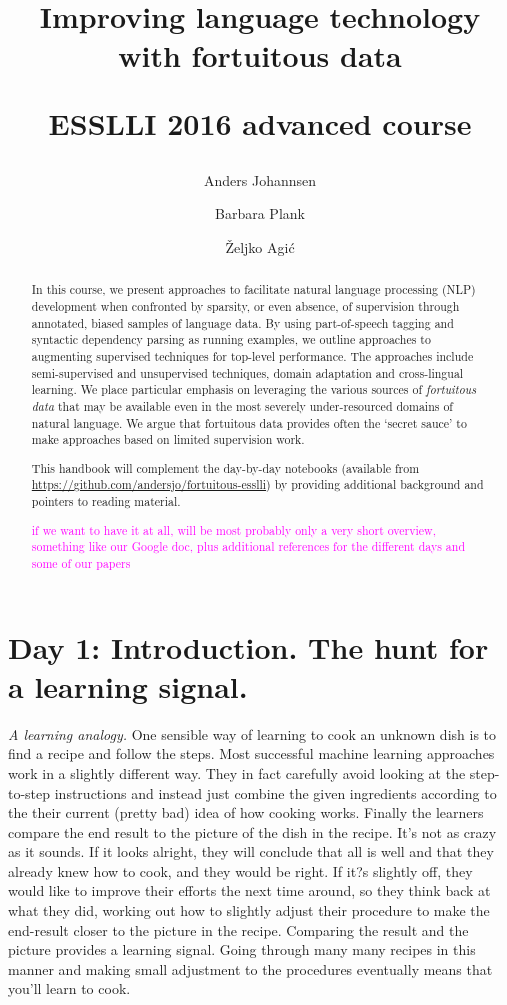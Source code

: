 \documentclass{article}
\title{Improving language technology \\with fortuitous data \\\begin{small}ESSLLI 2016 advanced course\end{small}}
\author{Anders Johannsen \and Barbara Plank\and Željko Agić}
\date{}
\begin{document}
\maketitle



\begin{abstract}
In this course, we present approaches to facilitate natural language processing (NLP) development when confronted by sparsity, or even absence, of supervision through annotated, biased samples of language data. By using part-of-speech tagging and syntactic dependency parsing as running examples, we outline approaches to augmenting supervised techniques for top-level performance. The approaches include semi-supervised and unsupervised techniques, domain adaptation and cross-lingual learning. We place particular emphasis on leveraging the various sources of \textit{fortuitous data} that may be available even in the most severely under-resourced domains of natural language. We argue that fortuitous data provides often the `secret sauce' to make approaches based on limited supervision work. 

This handbook will complement the day-by-day notebooks (available from \url{https://github.com/andersjo/fortuitous-esslli}) by providing additional background and pointers to reading material.

\textcolor{magenta}{if we want to have it at all, will be most probably only a very short overview, something like our Google doc, plus additional references for the different days and some of our papers}
\end{abstract}

\section{Day 1: Introduction. The hunt for a learning signal.}


\textit{A learning analogy.} One sensible way of learning to cook an unknown dish is to find a recipe and follow the steps. Most successful machine learning approaches work in a slightly different way. They in fact carefully avoid looking at the step-to-step instructions and instead just combine the given ingredients according to the their current (pretty bad) idea of how cooking works. Finally the learners compare the end result to the picture of the dish in the recipe. It's not as crazy as it sounds. If it looks alright, they will conclude that all is well and that they already knew how to cook, and they would be right. If it?s slightly off, they would like to improve their efforts the next time around, so they think back at what they did, working out how to slightly adjust their procedure to make the end-result closer to the picture in the recipe. Comparing the result and the picture provides a learning signal. Going through many many recipes in this manner and making small adjustment to the procedures eventually means that you'll learn to cook. 
\end{document}
